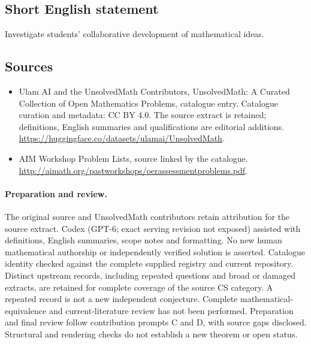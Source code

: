 \documentclass[11pt]{article}
\begin{document}
\subsection{Short English statement}
Investigate students' collaborative development of mathematical ideas.
\subsection{Sources}
\begin{itemize}
\item[\hypertarget{source:statement:1}{S1}] Ulam AI and the UnsolvedMath Contributors, UnsolvedMath: A Curated Collection of Open Mathematics Problems, catalogue entry. Catalogue curation and metadata: CC BY 4.0. The source extract is retained; definitions, English summaries and qualifications are editorial additions.
\url{https://huggingface.co/datasets/ulamai/UnsolvedMath}.
\item[\hypertarget{source:statement:2}{S2}] AIM Workshop Problem Lists, source linked by the catalogue.
\url{http://aimath.org/pastworkshops/oerassessmentproblems.pdf}.
\end{itemize}
\paragraph{Preparation and review.}
The original source and UnsolvedMath contributors retain attribution for the source extract. Codex (GPT-6; exact serving revision not exposed) assisted with definitions, English summaries, scope notes and formatting. No new human mathematical authorship or independently verified solution is asserted. Catalogue identity checked against the complete supplied registry and current repository. Distinct upstream records, including repeated questions and broad or damaged extracts, are retained for complete coverage of the source CS category. A repeated record is not a new independent conjecture. Complete mathematical-equivalence and current-literature review has not been performed. Preparation and final review follow contribution prompts C and D, with source gaps disclosed. Structural and rendering checks do not establish a new theorem or open status.
\label{end:statement}
\end{document}

